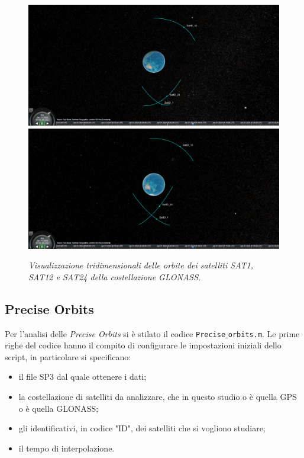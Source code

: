 \documentclass[a4paper,11pt,twoside]{book}
\begin{document}
	\begin{figure}[H]
		\centering
		{{\includegraphics[scale=0.27]{"Immagini workbook/Immagini esp2/glo3d1"}}}
		\qquad
		{{\includegraphics[scale=0.27]{"Immagini workbook/Immagini esp2/glo3d2"} }}
		\vspace{-0.3cm}
		\caption{\textit{Visualizzazione tridimensionali delle orbite dei satelliti SAT1, SAT12 e SAT24 della costellazione GLONASS.}}
		\label{glosc}
	\end{figure}


	\subsection{Precise Orbits}
	Per l'analisi delle \textit{Precise Orbits} si è stilato il codice \texttt{Precise$\_$orbits.m}. Le prime righe del codice hanno il compito di configurare le impostazioni iniziali dello script, in particolare si specificano:
	
	\begin{itemize}[-]
		\item il file SP3 dal quale ottenere i dati;
		
		\item la costellazione di satelliti da analizzare, che in questo studio o è quella GPS o è quella GLONASS;
		
		\item gli identificativi, in codice "ID", dei satelliti che si vogliono studiare;
		
		\item il tempo di interpolazione.
	\end{itemize}
\end{document}
